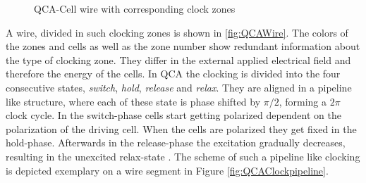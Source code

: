 \begin{figure}
%
	
	\caption{QCA-Cell wire with corresponding clock zones} \label{fig:QCAClock}
\end{figure}

A wire, divided in such clocking zones is shown in \ref{fig:QCAWire}. The colors of the zones and cells as well as the zone number show redundant information about the type of clocking zone. They differ in the external applied electrical field and therefore the energy of the cells. In QCA the clocking is divided into the four consecutive states, \textit{switch}, \textit{hold}, \textit{release} and \textit{relax}. They are aligned in a pipeline like structure, where each of these state is phase shifted by $\pi/2$, forming a $2\pi$ clock cycle. In the switch-phase cells start getting polarized dependent on the polarization of the driving cell. When the cells are polarized they get fixed in the hold-phase. Afterwards in the release-phase the excitation gradually decreases, resulting in the unexcited relax-state \cite{Sasamal2020QuantumDotCA}. The scheme of such a pipeline like clocking is depicted exemplary on a wire segment in Figure \ref{fig:QCAClockpipeline}.


